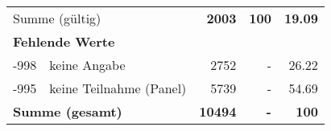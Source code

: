 \begin{longtable}{lXrrr}
     \midrule
     \multicolumn{2}{l}{Summe (gültig)} &
       \textbf{\num{2003}} &
     \textbf{100} &
       \textbf{\num[round-mode=places,round-precision=2]{19,09}} \\
     \multicolumn{5}{l}{\textbf{Fehlende Werte}}\\
       -998 &
       keine Angabe &
         \num{2752} &
        - &
         \num[round-mode=places,round-precision=2]{26,22} \\
       -995 &
       keine Teilnahme (Panel) &
         \num{5739} &
        - &
         \num[round-mode=places,round-precision=2]{54,69} \\
     \midrule
     \multicolumn{2}{l}{\textbf{Summe (gesamt)}} &
          \textbf{\num{10494}} &
        \textbf{-} &
        \textbf{100} \\
     \bottomrule
     \end{longtable}
     
